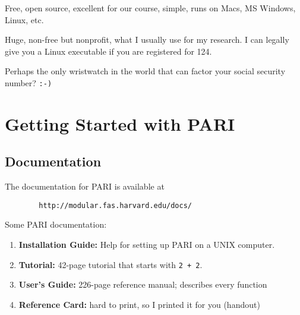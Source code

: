 \documentclass[11pt]{report}
\begin{document}
 Free, open source, excellent for our course, simple,
runs on Macs, MS Windows, Linux, etc.

 Huge, non-free but nonprofit,
what I usually use for my research.  I can legally give you a Linux
executable if you are registered for 124.

 Perhaps the only wristwatch in the world
that can factor your social security number?  {\tt :-)}

\section{Getting Started with PARI}
\subsection{Documentation}
The documentation for PARI is available at
\begin{verbatim}
        http://modular.fas.harvard.edu/docs/
\end{verbatim}
Some PARI documentation:
\begin{enumerate}
  \item {\bf Installation Guide:} Help for setting up PARI on a UNIX computer.
  \item {\bf Tutorial:} 42-page tutorial that starts with {\tt 2 + 2}.
  \item {\bf User's Guide:} 226-page reference manual; describes every function
  \item {\bf Reference Card:} hard to print, so I printed it for you (handout)
\end{enumerate}
\end{document}
